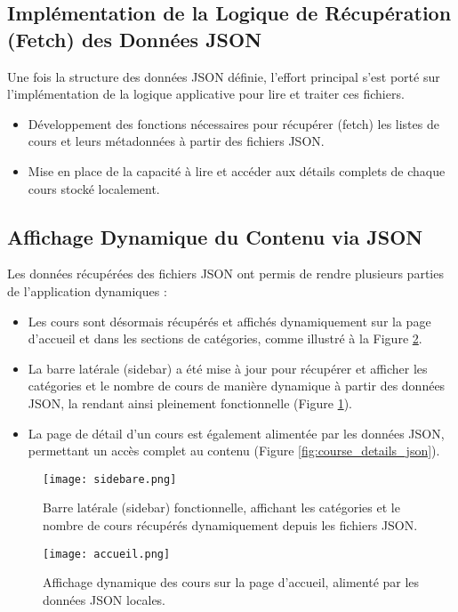 \documentclass[12pt, a4paper]{article}
\begin{document}
\subsection{Implémentation de la Logique de Récupération (Fetch) des Données JSON}
Une fois la structure des données JSON définie, l'effort principal s'est porté sur l'implémentation de la logique applicative pour lire et traiter ces fichiers.
\begin{itemize}
    \item Développement des fonctions nécessaires pour récupérer (fetch) les listes de cours et leurs métadonnées à partir des fichiers JSON.
    \item Mise en place de la capacité à lire et accéder aux détails complets de chaque cours stocké localement.
\end{itemize}

\subsection{Affichage Dynamique du Contenu via JSON}
Les données récupérées des fichiers JSON ont permis de rendre plusieurs parties de l'application dynamiques :
\begin{itemize}
    \item Les cours sont désormais récupérés et affichés dynamiquement sur la page d'accueil et dans les sections de catégories, comme illustré à la Figure \ref{fig:dynamic_courses_json}.
    \item La barre latérale (sidebar) a été mise à jour pour récupérer et afficher les catégories et le nombre de cours de manière dynamique à partir des données JSON, la rendant ainsi pleinement fonctionnelle (Figure \ref{fig:sidebar_json}).
    \item La page de détail d'un cours est également alimentée par les données JSON, permettant un accès complet au contenu (Figure \ref{fig:course_details_json}).
\end{itemize}

\begin{figure}[htbp]
  \centering
  \texttt{[image: sidebare.png]} %
  \caption{Barre latérale (sidebar) fonctionnelle, affichant les catégories et le nombre de cours récupérés dynamiquement depuis les fichiers JSON.}
  \label{fig:sidebar_json}
\end{figure}

\begin{figure}[htbp]
  \centering
  \texttt{[image: accueil.png]} %
  \caption{Affichage dynamique des cours sur la page d'accueil, alimenté par les données JSON locales.}
  \label{fig:dynamic_courses_json}
\end{figure}
\end{document}
